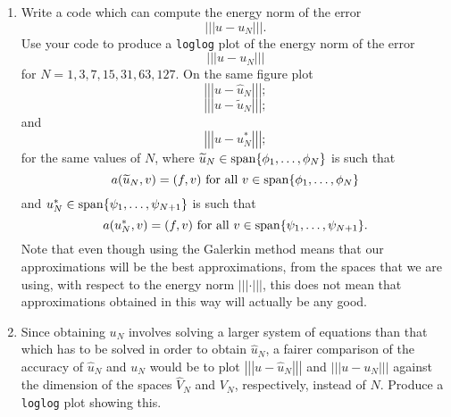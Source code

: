 \begin{enumerate}
\item Write a code which can compute the energy norm of the error 
\[
\left|\left|\left|u-u_N\right|\right|\right|.
\]
Use your code to produce a \verb|loglog| plot of the energy norm of the error
\[
\left|\left|\left|u-u_N\right|\right|\right|
\]
for $N=1,3,7,15,31,63,127$. On the same figure plot
\[
\left|\left|\left|u-\widehat{u}_N\right|\right|\right|;
\]
\[
\left|\left|\left|u-\widetilde{u}_N\right|\right|\right|;
\]
and
\[
\left|\left|\left|u-u_N^*\right|\right|\right|;
\]
for the same values of $N$, where $\widetilde{u}_N\in{\rm span}\{\phi_1,\ldots,\phi_N\}$ is such that
\[
a(\widetilde{u}_N,v)=(f,v)\mbox{ for all }v\in{\rm span}\{\phi_1,\ldots,\phi_N\}
\]
and $u_N^*\in{\rm span}\{\psi_1,\ldots,\psi_{N+1}\}$ is such that
\[
a(u_N^*,v)=(f,v)\mbox{ for all }v\in{\rm span}\{\psi_1,\ldots,\psi_{N+1}\}.
\]
Note that even though using the Galerkin method means that our approximations will be the best approximations, from the spaces that we are using, with respect to the energy norm $\left|\left|\left|\cdot\right|\right|\right|$, this does not mean that approximations obtained in this way will actually be any good.

\vspace*{1em}
\item Since obtaining $u_N$ involves solving a larger system of equations than that which has to be solved in order to obtain $\widehat{u}_N$, a fairer comparison of the accuracy of $\widehat{u}_N$ and $u_N$ would be to plot $\left|\left|\left|u-\widehat{u}_N\right|\right|\right|$ and $\left|\left|\left|u-u_N\right|\right|\right|$ against the dimension of the spaces $\widehat{V}_N$ and $V_N$, respectively, instead of $N$. Produce a \verb|loglog| plot showing this.


\end{enumerate}
